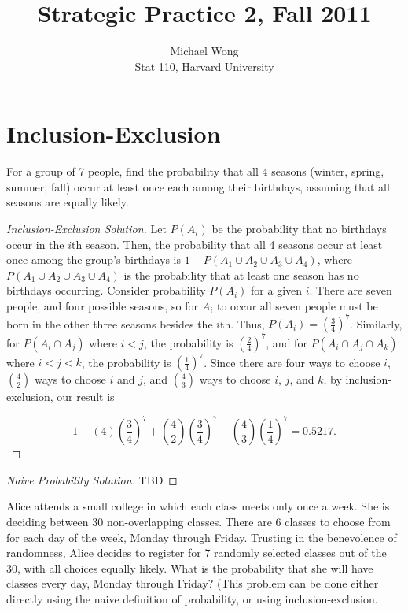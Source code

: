 \documentclass[10pt]{article}
\newenvironment{problem}[2][Problem]{\begin{trivlist}
\item[\hskip \labelsep {\bfseries #1}\hskip \labelsep {\bfseries #2.}]}{\end{trivlist}}
\begin{document}
 
\title{Strategic Practice 2, Fall 2011}
\author{Michael Wong\\
Stat 110, Harvard University}
\maketitle

\section{Inclusion-Exclusion}
 
\begin{problem}{1} 
For a group of 7 people, find the probability that all 4 seasons (winter, spring, summer, fall) occur at least once each among their birthdays, assuming that all seasons are equally likely.
\end{problem}

\begin{proof}[Inclusion-Exclusion Solution]
Let $P(A_i)$ be the probability that no birthdays occur in the $i$th season. Then, the probability that all 4 seasons occur at least once among the group's birthdays is $1 - P(A_1 \cup A_2 \cup A_3 \cup A_4)$, where $P(A_1 \cup A_2 \cup A_3 \cup A_4)$ is the probability that at least one season has no birthdays occurring. Consider probability $P(A_i)$ for a given $i$. There are seven people, and four possible seasons, so for $A_i$ to occur all seven people must be born in the other three seasons besides the $i$th. Thus, \(P(A_i) = (\frac{3}{4})^7\). Similarly, for $P(A_i \cap A_j)$ where $i < j$, the probability is \((\frac{2}{4})^7\), and for $P(A_i \cap A_j \cap A_k)$ where $i < j < k$, the probability is \((\frac{1}{4})^7\). Since there are four ways to choose $i$, \(\binom{4}{2}\) ways to choose $i$ and $j$, and \(\binom{4}{3}\) ways to choose $i$, $j$, and $k$, by inclusion-exclusion, our result is 

\[
1 - (4)\left(\frac{3}{4}\right)^7 + \binom{4}{2}\left(\frac{3}{4}\right)^7 - \binom{4}{3}\left(\frac{1}{4}\right)^7 = 0.5217.
\]

\end{proof}

\begin{proof}[Naive Probability Solution]
TBD
\end{proof}

\begin{problem}{2} 
Alice attends a small college in which each class meets only once a week. She is deciding between 30 non-overlapping classes. There are 6 classes to choose from for each day of the week, Monday through Friday. Trusting in the benevolence of randomness, Alice decides to register for 7 randomly selected classes out of the 30, with all choices equally likely. What is the probability that she will have classes every day, Monday through Friday? (This problem can be done either directly using the naive definition of probability, or using inclusion-exclusion.
\end{problem}
\end{document}
